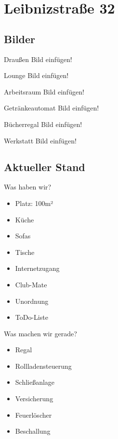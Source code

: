 \documentclass[hyperref={pdfpagelabels=false}]{beamer}
\begin{document}
\section{Leibnizstraße 32}

\subsection{Bilder}

\begin{frame}{Draußen}
    Bild einfügen!
\end{frame}

\begin{frame}{Lounge}
    Bild einfügen!
\end{frame}

\begin{frame}{Arbeitsraum}
    Bild einfügen!
\end{frame}

\begin{frame}{Getränkeautomat}
    Bild einfügen!
\end{frame}

\begin{frame}{Bücherregal}
    Bild einfügen!
\end{frame}

\begin{frame}{Werkstatt}
    Bild einfügen!
\end{frame}

\subsection{Aktueller Stand}

\begin{frame}{Was haben wir?}
    \begin{itemize}
        \item Platz: 100m²
        \pause
        \item Küche
        \item Sofas
        \item Tische
        \pause
        \item Internetzugang
        \item Club-Mate
        \pause
        \item Unordnung
        \item ToDo-Liste
    \end{itemize}
\end{frame}

\begin{frame}{Was machen wir gerade?}
    \begin{itemize}
        \item Regal
        \pause
        \item Rollladensteuerung
        \pause
        \item Schließanlage
        \pause
        \item Versicherung
        \item Feuerlöscher
        \item Beschallung
    \end{itemize}
\end{frame}
\end{document}
